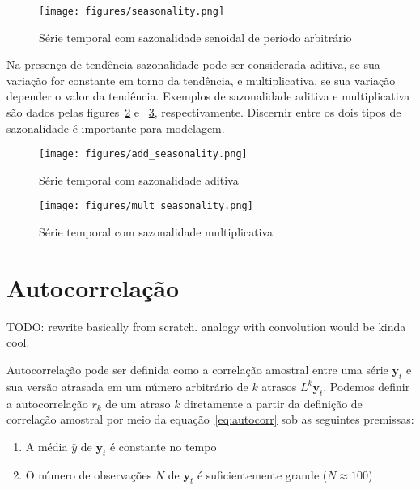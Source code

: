 \begin{figure}[H]
    \centering
    \texttt{[image: figures/seasonality.png]}
    \caption{Série temporal com sazonalidade senoidal de período arbitrário}
    \label{fig:seasonality}
\end{figure}

Na presença de tendência sazonalidade pode ser considerada aditiva, se sua
variação for constante em torno da tendência, e multiplicativa, se sua variação
depender o valor da tendência. Exemplos de sazonalidade aditiva e
multiplicativa são dados pelas figures~\ref{fig:add_seasonality} e
~\ref{fig:mult_seasonality}, respectivamente. Discernir entre os dois tipos de
sazonalidade é importante para modelagem.

\begin{figure}[H]
    \centering
    \texttt{[image: figures/add\_seasonality.png]}
    \caption{Série temporal com sazonalidade aditiva}
    \label{fig:add_seasonality}
\end{figure}

\begin{figure}[H]
    \centering
    \texttt{[image: figures/mult\_seasonality.png]}
    \caption{Série temporal com sazonalidade multiplicativa}
    \label{fig:mult_seasonality}
\end{figure}


\section{Autocorrelação}

TODO: rewrite basically from scratch. analogy with convolution would be kinda
cool.

Autocorrelação pode ser definida como a correlação amostral entre uma série
$\mathbf{y}_t$ e sua versão atrasada em um número arbitrário de $k$ atrasos
$L^k \mathbf{y}_t$. Podemos definir a autocorrelação $r_k$ de um atraso $k$
diretamente a partir da definição de correlação amostral por meio da
equação~\ref{eq:autocorr} sob as seguintes premissas:

\begin{enumerate}
    \item A média $\bar{y}$ de $\mathbf{y}_t$ é constante no tempo
    \item O número de observações  $N$ de $\mathbf{y}_t$ é suficientemente
    grande ($N \approx 100$)
\end{enumerate}

\vspace{1cm}

